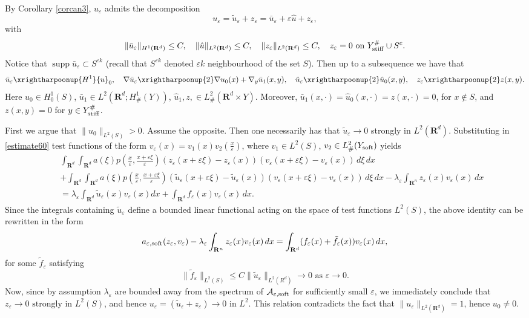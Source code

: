\documentclass[11pt]{article}
\newcommand\e {\varepsilon}
\newcommand\stiff{{\rm stiff}}
\newcommand\soft{{\rm soft}}
\def\RR{\R}
\newcommand{\R}{\mathbf{R}}
\def\AA{\mathcal{A}}
\newcommand\supp{\mathop{\operatorname{supp}}}
\theoremstyle{remark}
\begin{document}
	
	By Corollary \ref{corcan3}, $u_\e$ admits the decomposition
	$$ u_\e  = \widetilde{u}_\e +z_\e = \bar{u}_\e +\e \hat{u}+z_\e,$$
	 with
	$$\|\bar{u}_\e \|_{H^1(\RR^d)} \leq C, \quad \|\hat{u} \|_{L^2(\RR^d)} \leq C, \quad \|z_\e \|_{L^2(\RR^d)} \leq C, \quad z_\e =0 \textrm{ on }  Y_\stiff^{\#} \cup S^c.   $$
	 Notice that $\supp \bar{u}_\e \subset S^{\e k}$ (recall that $S^{\e k}$ denoted $\e k$ neighbourhood of the set $S$).
	 Then up to  a subsequence we have that
$$
\bar{u}_\e  \xrightharpoonup{H^1} {u}_0, \quad \nabla  \bar{u}_\e  \xrightharpoonup{2} \nabla {u}_0(x)+\nabla_y \bar{u}_1(x,y),\quad  \hat{u}_\e \xrightharpoonup{2} \hat{u}_0(x,y), \quad z_\e  \xrightharpoonup{2} z(x,y).
$$
	Here $u_0\in H^1_0(S)$, $\bar{u}_1 \in L^2(\R^d;H^1_\#(Y))$, $\hat{u}_1, z, \in L^2_\#(\R^d\times Y)$. Moreover, $\bar{u}_1(x,\cdot)=\hat{u}_0(x,\cdot)=z(x,\cdot)=0$, for $x \notin S$, and  $z(x,y)=0$ for $y \in  Y_\stiff^{\#}$.
	
	
	First we argue that $\|u_0\|_{L^2(S)} > 0$. Assume the opposite. Then one necessarily has that  $\widetilde{u}_\e  \to 0$ strongly in $L^2(\R^d)$.
	Substituting in \eqref{estimate60}  test functions of the form
	$ v_\e (x)=v_1(x) v_2(\frac{x}\e )$, where $v_1\in L^2(S)$, $v_2\in L^2_\#(Y_\soft)$ yields
	\begin{eqnarray} \nonumber
		& &\int_{\R^d} \int_{\R^d} a(\xi)p(\frac{x}\e , \frac{x+\e\xi}\e )\left(z_\e (x+\e \xi)-z_\e (x) \right) \left(v_\e (x+\e \xi)-v_\e (x) \right)\,d\xi\,dx \\ \nonumber & &+ \int_{\R^d} \int_{\R^d} a(\xi)p(\frac{x}\e , \frac{x+\e\xi}\e )\left(\widetilde{u}_\e (x+\e \xi)-\widetilde{u}_\e (x) \right) \left(v_\e (x+\e \xi)-v_\e (x) \right)\,d\xi\,dx-\lambda_\e \int_{\R^n} z_\e (x)v_\e (x) \,dx \\ \label{estimate67}& &=\lambda_\e  \int_{\R^d} \widetilde{u}_\e  (x)v_\e (x) dx+\int_{\R^d} f_\e (x) v_\e (x)\,dx.
	\end{eqnarray}
	Since the integrals containing $\widetilde{u}_\e$ define a bounded linear functional acting on the space of test functions $ L^2(S)$,  the above identity can be rewritten in the form
	\begin{equation*}
	a_{\e,\soft}(z_\e, v_\e) - \lambda_\e \int_{\R^n} z_\e (x)v_\e (x) \,dx = \int_{\R^d} (f_\e (x) + \tilde f_\e(x)) v_\e (x)\,dx,
	\end{equation*}
	for some $\tilde f_\e$ satisfying
	\begin{equation*}
	\|\tilde f_\e\|_{L^2(S)} \leq C \|\widetilde u_\e\|_{L^2(R^d)} \to 0 \mbox{ as } \e \to 0.
	\end{equation*}
Now, since by assumption $\lambda_\e$ are bounded away from the spectrum of $\AA_{\e,\soft}$ for sufficiently small $\e$, we immediately conclude that
	$z_\e  \to 0 \textrm{ strongly in } L^2(S)$, and hence
 $u_\e =(\widetilde{u}_\e +z_\e )\to 0$ in $L^2$. This relation contradicts the fact that $\|u_\e \|_{L^2(\RR^d)}=1$, hence  $u_0 \neq 0$.
	
\end{document}
